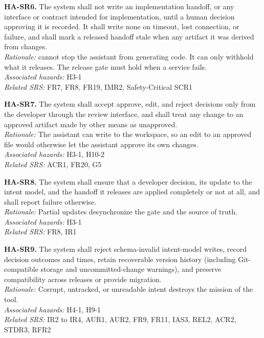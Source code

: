 \documentclass{article}
\begin{document}
\medskip
\noindent\textbf{HA-SR6.} The system shall not write an implementation handoff,
or any interface or contract intended for implementation, until a human
decision approving it is recorded. It shall write none on timeout, lost
connection, or failure, and shall mark a released handoff stale when any
artifact it was derived from changes.\\
\textit{Rationale:} \progname{} cannot stop the assistant from generating code.
It can only withhold what it releases. The release gate must hold when a
service fails.\\
\textit{Associated hazards:} H3-1\\
\textit{Related SRS:} FR7, FR8, FR19, IMR2, Safety-Critical SCR1

\medskip
\noindent\textbf{HA-SR7.} The system shall accept approve, edit, and reject
decisions only from the developer through the review interface, and shall treat
any change to an approved artifact made by other means as unapproved.\\
\textit{Rationale:} The assistant can write to the workspace, so an edit to an
approved file would otherwise let the assistant approve its own changes.\\
\textit{Associated hazards:} H3-1, H10-2\\
\textit{Related SRS:} ACR1, FR20, G5

\medskip
\noindent\textbf{HA-SR8.} The system shall ensure that a developer decision, its
update to the intent model, and the handoff it releases are applied completely
or not at all, and shall report failure otherwise.\\
\textit{Rationale:} Partial updates desynchronize the gate and the source of
truth.\\
\textit{Associated hazards:} H3-1\\
\textit{Related SRS:} FR8, IR1

\medskip
\noindent\textbf{HA-SR9.} The system shall reject schema-invalid intent-model
writes, record decision outcomes and times, retain recoverable version history
(including Git-compatible storage and uncommitted-change warnings), and preserve
compatibility across releases or provide migration.\\
\textit{Rationale:} Corrupt, untracked, or unreadable intent destroys the
mission of the tool.\\
\textit{Associated hazards:} H4-1, H9-1\\
\textit{Related SRS:} IR2 to IR4, AUR1, AUR2, FR9, FR11, IAS3, REL2, ACR2,
STDR3, RFR2
\end{document}
